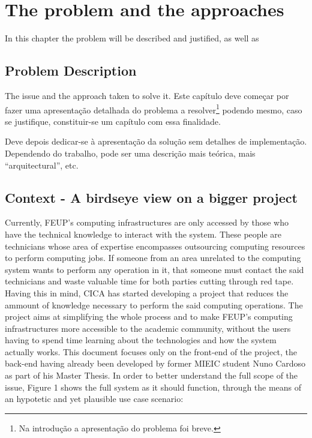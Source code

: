 \chapter{The problem and the approaches}\label{chap:chap3}

In this chapter the problem will be described and justified, as well as 

\section{Problem Description}

The issue and the approach taken to solve it.
Este capítulo deve começar por fazer uma apresentação detalhada do
problema a resolver\footnote{Na introdução a apresentação do
  problema foi breve.} podendo mesmo, caso se justifique,
constituir-se um capítulo com essa finalidade.

Deve depois dedicar-se à apresentação da solução sem detalhes de
implementação. 
Dependendo do trabalho, pode ser uma descrição mais teórica, mais
``arquitectural'', etc.


\section{Context - A birdseye view on a bigger project} \label{sec:project}

Currently, FEUP's computing infrastructures are only accessed by those who have the technical knowledge to interact with the system. These people are technicians whose area of expertise encompasses outsourcing computing resources to perform computing jobs. If someone from an area unrelated to the computing system wants to perform any operation in it, that someone must contact the said technicians and waste valuable time for both parties cutting through red tape.
Having this in mind, CICA has started developing a project that reduces the ammount of knowledge necessary to perform the said computing operations.
The project aims at simplifying the whole process and to make FEUP's computing infrastructures more accessible to the academic community, without the users having to spend time learning about the technologies and how the system actually works.
This document focuses only on the front-end of the project, the back-end having already been developed by former MIEIC student Nuno Cardoso as part of his Master Thesis.
In order to better understand the full scope of the issue, Figure 1 shows the full system as it should function, through the means of an hypotetic and yet plausible use case scenario:

